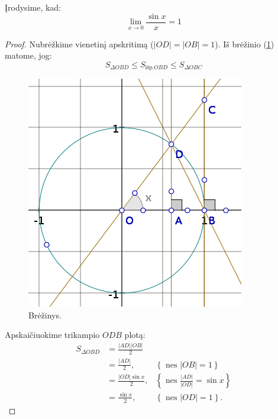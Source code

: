 \begin{exmp}
  Įrodysime, kad:
  \begin{equation*}
    \lim _{x \to 0} \frac{\sin x}{x} = 1
  \end{equation*}

  \begin{proof}

    Nubrėžkime vienetinį apskritimą ($|OD| = |OB| = 1$). Iš 
    brėžinio (\ref{fig:sinx_x}) matome, jog:
    \begin{equation}
      S _{\Delta OBD} \leq S _{\text{išp.}OBD} \leq S _{\Delta OBC}
      \label{_sinx_x_01}
    \end{equation}

    \begin{figure}[h!]
      \begin{center}
        \includegraphics[]{images/sinx_x.png}
      \end{center}
      \caption{Brėžinys.}
      \label{fig:sinx_x}
    \end{figure}

    Apskaičiuokime trikampio $ODB$ plotą:
    \begin{align*}
      S _{\Delta OBD} &= \frac{ |AD| |OB| }{2} \\
      &= \frac{ |AD| }{2}, &\left\{ \text{ nes } |OB| = 1 \right\} \\
      &= \frac{ |OD| \sin x }{2}, 
      &\left\{ \text{ nes } \frac{ |AD| }{ |OD| } = \sin x \right\} \\
      &= \frac{ \sin x }{2}, &\left\{ \text{ nes } |OD| = 1 \right\}.
    \end{align*}


\end{proof}
\end{exmp}
